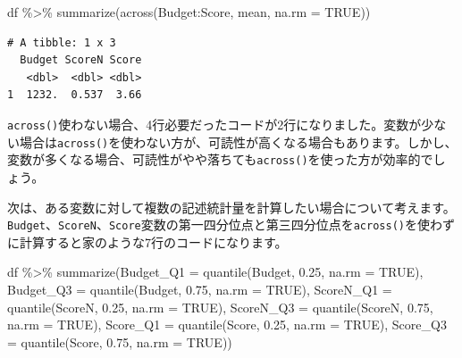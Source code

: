 \documentclass[
  a4paper,
  pandoc,
  ja=standard,
  jafont=haranoaji]{bxjsbook}
\newenvironment{Shaded}{\begin{snugshade}}{\end{snugshade}}
\newcommand{\AttributeTok}[1]{\textcolor[rgb]{0.00,0.48,0.65}{#1}}
\newcommand{\ConstantTok}[1]{\textcolor[rgb]{0.56,0.35,0.01}{#1}}
\newcommand{\FloatTok}[1]{\textcolor[rgb]{0.68,0.00,0.00}{#1}}
\newcommand{\FunctionTok}[1]{\textcolor[rgb]{0.28,0.35,0.67}{#1}}
\newcommand{\NormalTok}[1]{\textcolor[rgb]{0.00,0.48,0.65}{#1}}
\newcommand{\SpecialCharTok}[1]{\textcolor[rgb]{0.37,0.37,0.37}{#1}}
\begin{document}
\begin{Shaded}
\begin{Highlighting}[numbers=left,,]
\NormalTok{df }\SpecialCharTok{\%\textgreater{}\%}
  \FunctionTok{summarize}\NormalTok{(}\FunctionTok{across}\NormalTok{(Budget}\SpecialCharTok{:}\NormalTok{Score, mean, }\AttributeTok{na.rm =} \ConstantTok{TRUE}\NormalTok{))}
\end{Highlighting}
\end{Shaded}

\begin{verbatim}
# A tibble: 1 x 3
  Budget ScoreN Score
   <dbl>  <dbl> <dbl>
1  1232.  0.537  3.66
\end{verbatim}

\texttt{across()}使わない場合、4行必要だったコードが2行になりました。変数が少ない場合は\texttt{across()}を使わない方が、可読性が高くなる場合もあります。しかし、変数が多くなる場合、可読性がやや落ちても\texttt{across()}を使った方が効率的でしょう。

次は、ある変数に対して複数の記述統計量を計算したい場合について考えます。\texttt{Budget}、\texttt{ScoreN}、\texttt{Score}変数の第一四分位点と第三四分位点を\texttt{across()}を使わずに計算すると家のような7行のコードになります。

\begin{Shaded}
\begin{Highlighting}[numbers=left,,]
\NormalTok{df }\SpecialCharTok{\%\textgreater{}\%}
  \FunctionTok{summarize}\NormalTok{(}\AttributeTok{Budget\_Q1 =} \FunctionTok{quantile}\NormalTok{(Budget, }\FloatTok{0.25}\NormalTok{, }\AttributeTok{na.rm =} \ConstantTok{TRUE}\NormalTok{),}
            \AttributeTok{Budget\_Q3 =} \FunctionTok{quantile}\NormalTok{(Budget, }\FloatTok{0.75}\NormalTok{, }\AttributeTok{na.rm =} \ConstantTok{TRUE}\NormalTok{),}
            \AttributeTok{ScoreN\_Q1 =} \FunctionTok{quantile}\NormalTok{(ScoreN, }\FloatTok{0.25}\NormalTok{, }\AttributeTok{na.rm =} \ConstantTok{TRUE}\NormalTok{),}
            \AttributeTok{ScoreN\_Q3 =} \FunctionTok{quantile}\NormalTok{(ScoreN, }\FloatTok{0.75}\NormalTok{, }\AttributeTok{na.rm =} \ConstantTok{TRUE}\NormalTok{),}
            \AttributeTok{Score\_Q1  =} \FunctionTok{quantile}\NormalTok{(Score,  }\FloatTok{0.25}\NormalTok{, }\AttributeTok{na.rm =} \ConstantTok{TRUE}\NormalTok{),}
            \AttributeTok{Score\_Q3  =} \FunctionTok{quantile}\NormalTok{(Score,  }\FloatTok{0.75}\NormalTok{, }\AttributeTok{na.rm =} \ConstantTok{TRUE}\NormalTok{))}
\end{Highlighting}
\end{Shaded}
\end{document}
